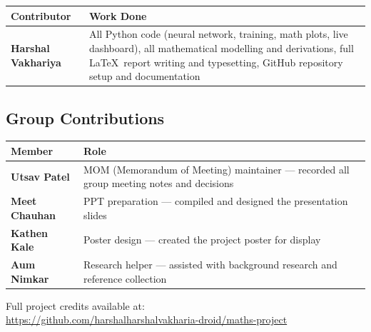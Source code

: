 \documentclass[12pt,a4paper]{article}
\begin{document}
\begin{tabular}{>{\bfseries}p{4.5cm} p{9.5cm}}
  \toprule
  \textbf{Contributor} & \textbf{Work Done} \\
  \midrule
  Harshal Vakhariya & All Python code (neural network, training, math plots, live dashboard), all mathematical modelling and derivations, full \LaTeX\ report writing and typesetting, GitHub repository setup and documentation \\
  \bottomrule
\end{tabular}

\vspace{0.8cm}

\subsection*{Group Contributions}

\begin{tabular}{>{\bfseries}p{4.5cm} p{9.5cm}}
  \toprule
  \textbf{Member} & \textbf{Role} \\
  \midrule
  Utsav Patel   & MOM (Memorandum of Meeting) maintainer --- recorded all group meeting notes and decisions \\[4pt]
  Meet Chauhan  & PPT preparation --- compiled and designed the presentation slides \\[4pt]
  Kathen Kale   & Poster design --- created the project poster for display \\[4pt]
  Aum Nimkar    & Research helper --- assisted with background research and reference collection \\
  \bottomrule
\end{tabular}

\vspace{0.8cm}

\begin{center}
  \small\color{gray}
  Full project credits available at:\\
  \url{https://github.com/harshalharshalvakharia-droid/maths-project}
\end{center}
\end{document}
